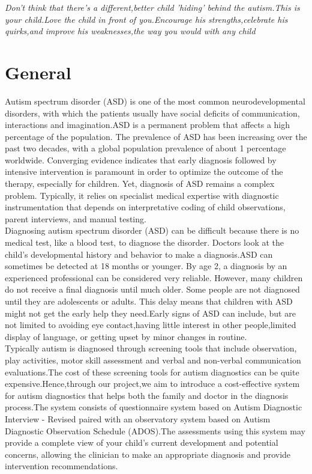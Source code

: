 {\em Don't think that there's a different,better child 'hiding' behind the autism.This is your child.Love the child in front of you.Encourage his strengths,celebrate his quirks,and improve his weaknesses,the way you would with any child}

\section{General}    %

Autism spectrum disorder (ASD) is one of the most common neurodevelopmental disorders, with which the patients usually have social deficits of communication, interactions and imagination.ASD is a permanent problem that affects a high percentage of the population. The prevalence of ASD has been increasing over the past two decades, with a global population prevalence of about 1 percentage worldwide. Converging evidence indicates that early diagnosis followed by intensive intervention is paramount in order to optimize the outcome of the therapy, especially for children. Yet, diagnosis of ASD remains a complex problem. Typically, it relies on specialist medical expertise with diagnostic instrumentation that depends on interpretative coding of child observations, parent interviews, and manual testing.\\
Diagnosing autism spectrum disorder (ASD) can be difficult because there is no medical test, like a blood test, to diagnose the disorder. Doctors look at the child’s developmental history and behavior to make a diagnosis.ASD can sometimes be detected at 18 months or younger. By age 2, a diagnosis by an experienced professional can be considered very reliable. However, many children do not receive a final diagnosis until much older. Some people are not diagnosed until they are adolescents or adults. This delay means that children with ASD might not get the early help they need.Early signs of ASD can include, but are not limited to avoiding eye contact,having little interest in other people,limited display of language, or getting upset by minor changes in routine.\\
Typically autism is diagnosed through screening tools that include observation, play activities, motor skill assessment and verbal and non-verbal communication evaluations.The cost of these screening tools for autism diagnostics can be quite expensive.Hence,through our project,we aim to introduce a cost-effective system for autism diagnostics that helps both the family and doctor in the diagnosis process.The system consists of questionnaire system based on Autism Diagnostic Interview - Revised paired with an observatory system based on Autism Diagnostic Observation Schedule (ADOS).The assessments using this system may provide a complete view of your child’s current development and potential concerns, allowing the clinician to make an appropriate diagnosis and provide intervention recommendations.





